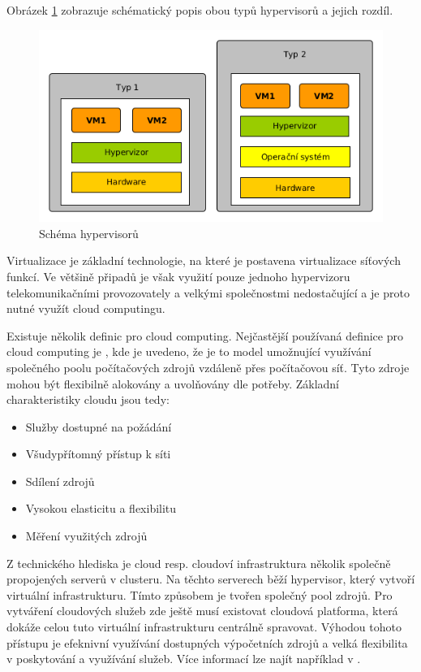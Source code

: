 Obrázek \ref{fig:virtualization} zobrazuje schématický popis obou typů hypervisorů a jejich rozdíl.

\begin{figure}[h]
\begin{centering}
\includegraphics[scale=0.5]{images/virtualization}
\par\end{centering}
\caption{Schéma hypervisorů \label{fig:virtualization}}
\end{figure}

Virtualizace je základní technologie, na které je postavena virtualizace síťových funkcí. Ve většině připadů je však využití pouze jednoho hypervizoru telekomunikačními provozovately a velkými společnostmi nedostačující a je proto nutné využít cloud computingu.

Existuje několik definic pro cloud computing. Nejčastější používaná definice pro cloud computing je \cite{nist_definition}, kde je uvedeno, že je to  model umožnující využívání společného poolu počítačových zdrojů vzdáleně přes počítačovou síť. Tyto zdroje mohou být flexibilně alokovány a uvolňovány dle potřeby. Základní charakteristiky cloudu jsou tedy:

\begin{itemize}
\item Služby dostupné na požádání
\item Všudypřítomný přístup k síti
\item Sdílení zdrojů
\item Vysokou elasticitu a flexibilitu
\item Měření využitých zdrojů
\end{itemize}

Z technického hlediska je cloud resp. cloudoví infrastruktura několik společně propojených serverů v clusteru. Na těchto serverech běží hypervisor, který vytvoří virtuální infrastrukturu. Tímto způsobem je tvořen společný pool zdrojů. Pro vytváření cloudových služeb zde ještě musí existovat cloudová platforma, která dokáže celou tuto virtuální infrastrukturu centrálně spravovat. Výhodou tohoto přístupu je efeknivní využívání dostupných výpočetních zdrojů a velká flexibilita v poskytování a využívání služeb. Více informací lze najít například v \cite{cloud_book}.

